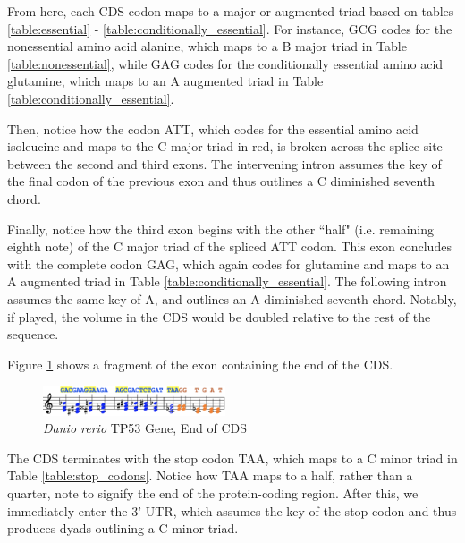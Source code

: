 \documentclass[letterpaper]{article}
\begin{document}
From here, each CDS codon maps to a major or augmented triad based on tables \ref{table:essential} - \ref{table:conditionally_essential}. For instance, GCG codes for the nonessential amino acid alanine, which maps to a B major triad in Table \ref{table:nonessential}, while GAG codes for the conditionally essential amino acid glutamine, which maps to an A augmented triad in Table \ref{table:conditionally_essential}. 

Then, notice how the codon ATT, which codes for the essential amino acid isoleucine and maps to the C\musSharp\; major triad in red, is broken across the splice site between the second and third exons. The intervening intron assumes the key of the final codon of the previous exon and thus outlines a C\musSharp \; diminished seventh chord. 

Finally, notice how the third exon begins with the other ``half" (i.e.  remaining eighth note) of the C\musSharp\; major triad of the spliced ATT codon. This exon concludes with the complete codon GAG, which again codes for glutamine and maps to an A augmented triad in Table \ref{table:conditionally_essential}. The following intron assumes the same key of A, and outlines an A \; diminished seventh chord. Notably, if played, the volume in the CDS would be doubled relative to the rest of the sequence.

Figure \ref{fig:danio_rerio_end_translation} shows a fragment of the exon containing the end of the CDS. 

\begin{figure}[h!]
\centering
\includegraphics[width=0.48\textwidth]{images/danio_rerio_end_translation}
\vspace{-3mm}
  \caption{\textit{Danio rerio} TP53 Gene, End of CDS}
  \label{fig:danio_rerio_end_translation}
  \vspace{-3mm}
\end{figure}

The CDS terminates with the stop codon TAA, which maps to a C minor triad in Table \ref{table:stop_codons}. Notice how TAA maps to a half, rather than a quarter, note to signify the end of the protein-coding region. After this, we immediately enter the 3' UTR, which assumes the key of the stop codon and thus produces dyads outlining a C minor triad. 
\end{document}
